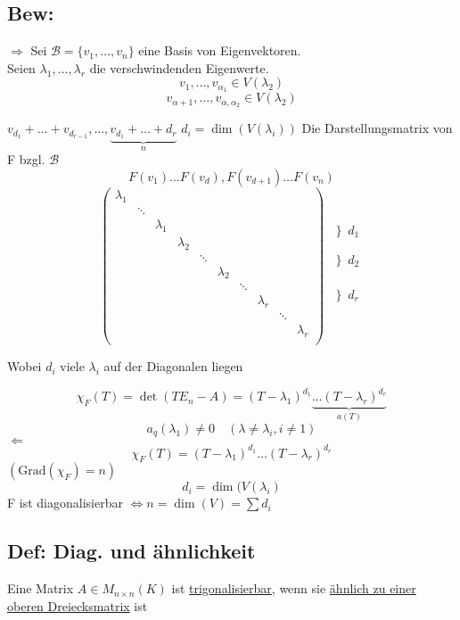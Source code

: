 \documentclass[titlepage,12pt,a4paper,ngerman]{report}
\newcommand{\tx}[1]{\textrm{#1}}
\newcommand{\ub}[1]{\underbrace{#1}}
\begin{document}
\subsection{Bew:}
$\Rightarrow$ Sei $\mathcal{B}= \{v_1,\dots,v_n\}$ eine Basis von Eigenvektoren.\\
Seien $\lambda_1,\dots,\lambda_r$ die verschwindenden Eigenwerte.
$$v_1,\dots,v_{\alpha_1} \in V(\lambda_2)$$
$$v_{\alpha + 1}, \dots , v_{\alpha, \alpha_2} \in V(\lambda_2)$$

$v_{d_1}+ \dots + v_{d_{r-1}}, \dots , \ub{v_{d_1}+ \dots + d_r}_{n}$
$d_i = \dim(V(\lambda_i))$
Die Darstellungsmatrix von F bzgl. $\mathcal{B}$
$$F(v_1) \dots F(v_d), F(v_{d+1}) \dots F(v_n)$$ 
$$\begin{pmatrix}
\lambda_1\\
& \ddots\\
& & \lambda_1\\
& & & \lambda_2\\
& & & &\ddots\\
& & & & & \lambda_2\\
& & & & & &\ddots\\
& & & & & & & \lambda_r\\
& & & & & & & & \ddots \\
& & & & & & & & & \lambda_r\\
\end{pmatrix}\begin{matrix}
\\
\left\}d_1 \right.\\
\\
\\
\left\}d_2 \right.\\
\\
\\
\\
\left\}d_r \right.\\
\\
\end{matrix}$$

Wobei $d_i$ viele $ \lambda_i $ auf der Diagonalen liegen

$$\chi_F(T) = \det(T E_n - A) = (T-\lambda_1)^{d_1} \ub{\dots (T-\lambda_r)^{d_r}}_{a(T)}$$
$$a_q(\lambda_1) \neq 0 \quad (\lambda\neq \lambda_i , i \neq 1)$$
$ \Leftarrow$
$$\chi_F(T) = (T-\lambda_1)^{d_1} \dots (T-\lambda_r)^{d_r}$$
$(\tx{Grad}(\chi_F) = n)$
$$d_i = \dim(V(\lambda_i)$$
F ist diagonalisierbar $\Leftrightarrow n = \dim(V) = \sum d_i$


\subsection{Def: Diag. und ähnlichkeit} Eine Matrix $A \in M_{n\times n} (K)$ ist \underline{trigonalisierbar}, wenn sie \underline{ähnlich zu einer} \underline{oberen Dreiecksmatrix} ist 
\end{document}
